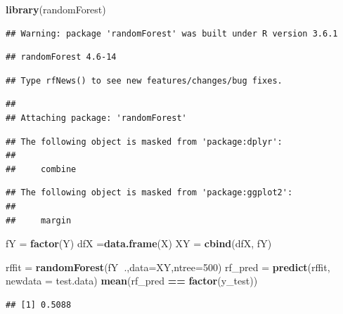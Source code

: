 \documentclass[]{article}
\newenvironment{Shaded}{\begin{snugshade}}{\end{snugshade}}
\newcommand{\DataTypeTok}[1]{\textcolor[rgb]{0.13,0.29,0.53}{#1}}
\newcommand{\DecValTok}[1]{\textcolor[rgb]{0.00,0.00,0.81}{#1}}
\newcommand{\KeywordTok}[1]{\textcolor[rgb]{0.13,0.29,0.53}{\textbf{#1}}}
\newcommand{\NormalTok}[1]{#1}
\newcommand{\OperatorTok}[1]{\textcolor[rgb]{0.81,0.36,0.00}{\textbf{#1}}}
\newcommand{\StringTok}[1]{\textcolor[rgb]{0.31,0.60,0.02}{#1}}
\begin{document}
\begin{Shaded}
\begin{Highlighting}[]
\KeywordTok{library}\NormalTok{(randomForest)}
\end{Highlighting}
\end{Shaded}

\begin{verbatim}
## Warning: package 'randomForest' was built under R version 3.6.1
\end{verbatim}

\begin{verbatim}
## randomForest 4.6-14
\end{verbatim}

\begin{verbatim}
## Type rfNews() to see new features/changes/bug fixes.
\end{verbatim}

\begin{verbatim}
## 
## Attaching package: 'randomForest'
\end{verbatim}

\begin{verbatim}
## The following object is masked from 'package:dplyr':
## 
##     combine
\end{verbatim}

\begin{verbatim}
## The following object is masked from 'package:ggplot2':
## 
##     margin
\end{verbatim}

\begin{Shaded}
\begin{Highlighting}[]
\NormalTok{fY =}\StringTok{ }\KeywordTok{factor}\NormalTok{(Y)}
\NormalTok{dfX =}\KeywordTok{data.frame}\NormalTok{(X)}
\NormalTok{XY =}\StringTok{ }\KeywordTok{cbind}\NormalTok{(dfX, fY)}

\NormalTok{rffit =}\StringTok{ }\KeywordTok{randomForest}\NormalTok{(fY}\OperatorTok{~}\NormalTok{.,}\DataTypeTok{data=}\NormalTok{XY,}\DataTypeTok{ntree=}\DecValTok{500}\NormalTok{)}
\NormalTok{rf_pred =}\StringTok{ }\KeywordTok{predict}\NormalTok{(rffit, }\DataTypeTok{newdata =}\NormalTok{ test.data)}
\KeywordTok{mean}\NormalTok{(rf_pred }\OperatorTok{==}\StringTok{ }\KeywordTok{factor}\NormalTok{(y_test))}
\end{Highlighting}
\end{Shaded}

\begin{verbatim}
## [1] 0.5088
\end{verbatim}
\end{document}
